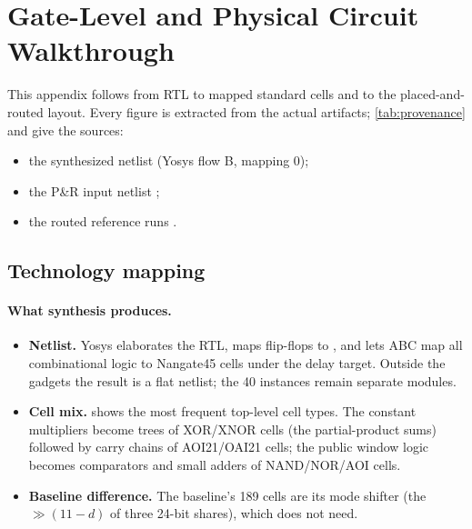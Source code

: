 \section{Gate-Level and Physical Circuit Walkthrough}\label{app:circuit}
This appendix follows  from RTL to mapped standard cells and to the placed-and-routed layout. Every figure is extracted from the actual artifacts; \cref{tab:provenance} and  give the sources:
\begin{itemize}
  \item the synthesized netlist  (Yosys flow B, mapping 0);
  \item the P\&R input netlist ;
  \item the routed reference runs .
\end{itemize}

\subsection{Technology mapping}\label{app:techmap}
\paragraph{What synthesis produces.}
\begin{itemize}
  \item \textbf{Netlist.} Yosys elaborates the RTL, maps flip-flops to , and lets ABC map all combinational logic to Nangate45 cells under the delay target. Outside the gadgets the result is a flat netlist; the 40  instances remain separate modules.
  \item \textbf{Cell mix.}  shows the most frequent top-level cell types. The constant multipliers become trees of XOR/XNOR cells (the partial-product sums) followed by carry chains of AOI21/OAI21 cells; the public window logic becomes comparators and small adders of NAND/NOR/AOI cells.
  \item \textbf{Baseline difference.} The baseline's 189  cells are its mode shifter (the $\gg (11 - d)$ of three 24-bit shares), which \PAMS{} does not need.
\end{itemize}

